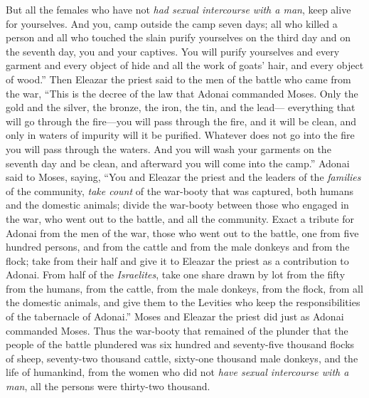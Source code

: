 \begin{biblechapter}
\verse But all the females who have not \textit{had sexual intercourse with a man}, keep alive for yourselves.
\verse And you, camp outside the camp seven days; all who killed a person and all who touched the slain purify yourselves on the third day and on the seventh day, you and your captives.
\verse You will purify yourselves and every garment and every object of hide and all the work of goats’ hair, and every object of wood.”
\verse Then Eleazar the priest said to the men of the battle who came from the war, “This is the decree of the law that Adonai commanded Moses.
\verse Only the gold and the silver, the bronze, the iron, the tin, and the lead—
\verse everything that will go through the fire—you will pass through the fire, and it will be clean, and only in waters of impurity will it be purified. Whatever does not go into the fire you will pass through the waters.
\verse And you will wash your garments on the seventh day and be clean, and afterward you will come into the camp.”
 Adonai said to Moses, saying,
\verse “You and Eleazar the priest and the leaders of the \textit{families} of the community, \textit{take count} of the war-booty that was captured, both humans and the domestic animals;
\verse divide the war-booty between those who engaged in the war, who went out to the battle, and all the community.
\verse Exact a tribute for Adonai from the men of the war, those who went out to the battle, one from five hundred persons, and from the cattle and from the male donkeys and from the flock;
\verse take from their half and give it to Eleazar the priest as a contribution to Adonai.
\verse From half of the \textit{Israelites}, take one share drawn by lot from the fifty from the humans, from the cattle, from the male donkeys, from the flock, from all the domestic animals, and give them to the Levities who keep the responsibilities of the tabernacle of Adonai.”
\verse Moses and Eleazar the priest did just as Adonai commanded Moses.
\verse Thus the war-booty that remained of the plunder that the people of the battle plundered was six hundred and seventy-five thousand flocks of sheep,
\verse seventy-two thousand cattle,
\verse sixty-one thousand male donkeys,
\verse and the life of humankind, from the women who did not \textit{have sexual intercourse with a man}, all the persons were thirty-two thousand.

\end{biblechapter}
